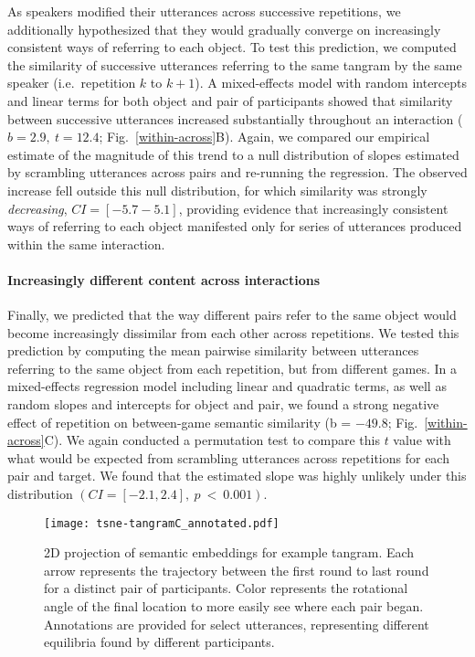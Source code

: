 As speakers modified their utterances across successive repetitions, we additionally hypothesized that they would gradually converge on increasingly consistent ways of referring to each object.
To test this prediction, we computed the similarity of successive utterances referring to the same tangram by the same speaker (i.e.~repetition $k$ to $k+1$). %
A mixed-effects model with random intercepts and linear terms for both object and pair of participants showed that similarity between successive utterances increased substantially throughout an interaction ($b = 2.9,~t = 12.4$; Fig.~\ref{within-across}B).
Again, we compared our empirical estimate of the magnitude of this trend to a null distribution of slopes estimated by scrambling utterances across pairs and re-running the regression.%
The observed increase fell outside this null distribution, for which similarity was strongly \emph{decreasing}, $CI = [-5.7 -5.1]$, providing evidence that increasingly consistent ways of referring to each object manifested only for series of utterances produced within the same interaction.

\paragraph{Increasingly different content across interactions}
Finally, we predicted that the way different pairs refer to the same object would become increasingly dissimilar from each other across repetitions.
We tested this prediction by computing the mean pairwise similarity between utterances referring to the same object from each repetition, but from different games.
In a mixed-effects regression model including linear and quadratic terms, as well as random slopes and intercepts for object and pair, we found a strong negative effect of repetition on between-game semantic similarity (b = $-49.8$; Fig.~\ref{within-across}C). %
We again conducted a permutation test to compare this $t$ value with what would be expected from scrambling utterances across repetitions for each pair and target.
We found that the estimated slope was highly unlikely under this distribution $(CI = [-2.1, 2.4],~p~<~0.001)$.


\begin{figure}[t!]
\centering
\texttt{[image: tsne-tangramC\_annotated.pdf]}
\caption{2D projection of semantic embeddings for example tangram. Each arrow represents the trajectory between the first round to last round for a distinct pair of participants. Color represents the rotational angle of the final location to more easily see where each pair began. Annotations are provided for select utterances, representing different equilibria found by different participants.}
\label{fig:tsne}
\end{figure}


